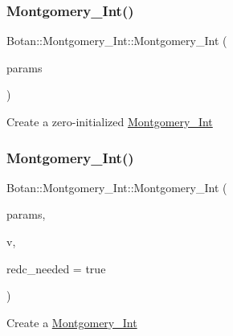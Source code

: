 \subsubsection{\texorpdfstring{Montgomery\+\_\+\+Int()}{Montgomery\_Int()}\hspace{0.1cm}{\footnotesize\ttfamily [1/4]}}
{\footnotesize\ttfamily Botan\+::\+Montgomery\+\_\+\+Int\+::\+Montgomery\+\_\+\+Int (\begin{DoxyParamCaption}\item[{std\+::shared\+\_\+ptr$<$ const \hyperlink{class_botan_1_1_montgomery___params}{Montgomery\+\_\+\+Params} $>$}]{params }\end{DoxyParamCaption})\hspace{0.3cm}{\ttfamily [inline]}}

Create a zero-\/initialized \hyperlink{class_botan_1_1_montgomery___int}{Montgomery\+\_\+\+Int} \mbox{\label{class_botan_1_1_montgomery___int_acc0e9d1c3a33343a1f70f1850a12160f}} 
\subsubsection{\texorpdfstring{Montgomery\+\_\+\+Int()}{Montgomery\_Int()}\hspace{0.1cm}{\footnotesize\ttfamily [2/4]}}
{\footnotesize\ttfamily Botan\+::\+Montgomery\+\_\+\+Int\+::\+Montgomery\+\_\+\+Int (\begin{DoxyParamCaption}\item[{std\+::shared\+\_\+ptr$<$ const \hyperlink{class_botan_1_1_montgomery___params}{Montgomery\+\_\+\+Params} $>$}]{params,  }\item[{const Big\+Int \&}]{v,  }\item[{bool}]{redc\+\_\+needed = {\ttfamily true} }\end{DoxyParamCaption})}

Create a \hyperlink{class_botan_1_1_montgomery___int}{Montgomery\+\_\+\+Int} \mbox{\label{class_botan_1_1_montgomery___int_a40f15c2012a27cc98c720de74200117d}} 
